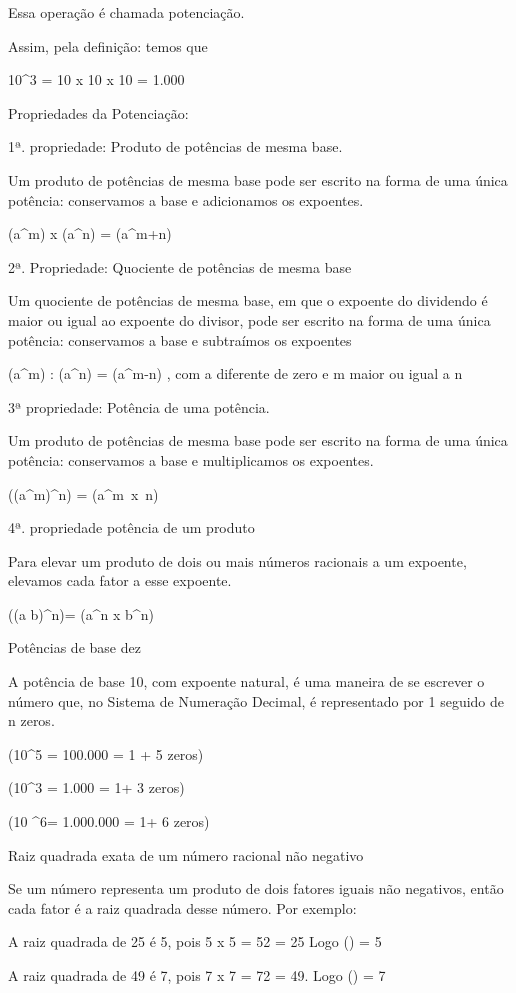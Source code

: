 Essa operação é chamada potenciação.

Assim, pela definição: temos que

10^3 = 10 x 10 x 10 = 1.000

Propriedades da Potenciação:

1ª. propriedade: Produto de potências de mesma base.

Um produto de potências de mesma base pode ser escrito na forma de uma
única potência: conservamos a base e adicionamos os expoentes.

(a^m) x (a^n) = (a^{m+n})

2ª. Propriedade: Quociente de potências de mesma base

Um quociente de potências de mesma base, em que o expoente do dividendo
é maior ou igual ao expoente do divisor, pode ser escrito na forma de
uma única potência: conservamos a base e subtraímos os expoentes

(a^m) : (a^n) = (a^{m-n}) , com a diferente de zero e m maior ou
igual a n

3ª propriedade: Potência de uma potência.

Um produto de potências de mesma base pode ser escrito na forma de uma
única potência: conservamos a base e multiplicamos os expoentes.

((a^m)^n) = (a^{m\ x\ n})

4ª. propriedade potência de um produto

Para elevar um produto de dois ou mais números racionais a um expoente,
elevamos cada fator a esse expoente.

((a \times b)^n)= (a^n x b^n)

Potências de base dez

A potência de base 10, com expoente natural, é uma maneira de se
escrever o número que, no Sistema de Numeração Decimal, é representado
por 1 seguido de n zeros.

(10^5 = 100.000 = 1 + 5 \;zeros)

(10^3 = 1.000 = 1+ 3 \;zeros)

(10 ^6= 1.000.000 = 1+ 6 \;zeros)

Raiz quadrada exata de um número racional não negativo

Se um número representa um produto de dois fatores iguais não negativos,
então cada fator é a raiz quadrada desse número. Por exemplo:

A raiz quadrada de 25 é 5, pois 5 x 5 = 52 = 25 Logo () = 5

A raiz quadrada de 49 é 7, pois 7 x 7 = 72 = 49. Logo () = 7

